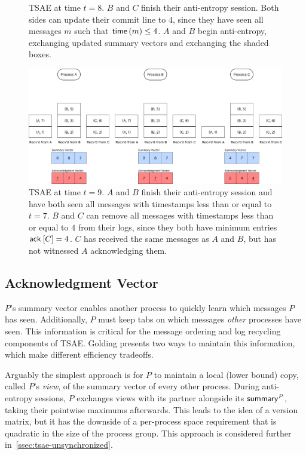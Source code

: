 \documentclass[]             %
{NASA}                       %
\theoremstyle{definition}
\begin{document}
\begin{landscape}
\begin{figure}[h]
    \caption{TSAE at time $t=8$. $B$ and $C$ finish their anti-entropy session. Both sides can update their commit line to $4$, since they have seen all messages $m$ such that $\mathsf{time}\left(m\right) \leq 4$. $A$ and $B$ begin anti-entropy, exchanging updated summary vectors and exchanging the shaded boxes.}
    \label{fig:tsae6}
  \end{figure}
  \begin{figure}[h]
    \centering
    \includegraphics[width=1.4\textwidth]{images/tsae/TSAE9.png}
    \caption{TSAE at time $t=9$. $A$ and $B$ finish their anti-entropy
      session and have both seen all messages with timestamps less than
      or equal to $t = 7$. $B$ and $C$ can remove all messages with
      timestamps less than or equal to $4$ from their logs, since they
      both have minimum entries $\mathsf{ack}^{}\left[C\right] = 4$. $C$ has received the
      same messages as $A$ and $B$, but has not witnessed $A$
      acknowledging them.}
    \label{fig:tsae6}
  \end{figure}
\end{landscape}

\subsection{Acknowledgment Vector}
\label{ssec:tsae-acknowledgment}
$P$'s summary vector enables another process to quickly learn which
messages $P$ has seen. Additionally, $P$ must keep tabs on which
messages \emph{other} processes have seen. This information is
critical for the message ordering and log recycling components of
TSAE. Golding presents two ways to maintain this information, which
make different efficiency tradeoffs.

Arguably the simplest approach is for $P$ to maintain a local (lower
bound) copy, called $P$'s \emph{view}, of the summary vector of every
other process. During anti-entropy sessions, $P$ exchanges views with
its partner alongside its $\mathsf{summary}^{P}$, taking their pointwise
maximums afterwards. This leads to the idea of a version matrix, but
it has the downside of a per-process space requirement that is
quadratic in the size of the process group. This approach is
considered further in~\ref{ssec:tsae-unsynchronized}.
\end{document}
